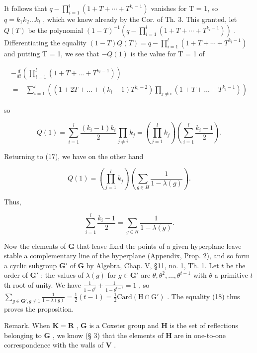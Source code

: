 It follows that \(q - \prod_{i=1}^{l} (1 + T + \cdots + T^{k_i - 1})\) vanishes for T = 1, so \(q = k_1 k_2 \ldots k_l\) , which we knew already by the Cor. of Th. 3. This granted, let \(Q(T)\) be the polynomial \((1 - T)^{-1}(q - \prod_{i=1}^{l} (1 + T + \cdots + T^{k_i - 1}))\) . Differentiating the equality \((1 - T)Q(T) = q - \prod_{i=1}^{l} (1 + T + \cdots + T^{k_i - 1})\) and putting T = 1, we see that \(-Q(1)\) is the value for T = 1 of

\[
\begin{array}{l} - \frac {d}{d t} \left(\prod_ {i = 1} ^ {l} (1 + T + \dots + T ^ {k _ {i} - 1})\right) \\ = - \sum_ {i = 1} ^ {l} \left((1 + 2 T + \dots + (k _ {i} - 1) T ^ {k _ {i} - 2}) \prod_ {j \neq i} (1 + T + \dots + T ^ {k _ {j} - 1})\right) \end{array}
\]

so

\[
Q (1) = \sum_ {i = 1} ^ {l} \frac {\left(k _ {i} - 1\right) k _ {i}}{2} \prod_ {j \neq i} k _ {j} = \left(\prod_ {j = 1} ^ {l} k _ {j}\right) \left(\sum_ {i = 1} ^ {l} \frac {k _ {i} - 1}{2}\right).
\]

Returning to (17), we have on the other hand

\[
Q (1) = \left(\prod_ {j = 1} ^ {l} k _ {j}\right) \left(\sum_ {g \in H} \frac {1}{1 - \lambda (g)}\right).
\]

Thus,

\[
\sum_ {i = 1} ^ {l} \frac {k _ {i} - 1}{2} = \sum_ {g \in H} \frac {1}{1 - \lambda (g)}.\tag{18}
\]

Now the elements of \(\mathbf{G}\) that leave fixed the points of a given hyperplane leave stable a complementary line of the hyperplane (Appendix, Prop. 2), and so form a cyclic subgroup \(\mathbf{G}'\) of \(\mathbf{G}\) by Algebra, Chap. V, §11, no. 1, Th. 1. Let \(t\) be the order of \(\mathbf{G}'\) ; the values of \(\lambda(g)\) for \(g \in \mathbf{G}'\) are \(\theta, \theta^2, \ldots, \theta^{t-1}\) with \(\theta\) a primitive \(t\) th root of unity. We have \(\frac{1}{1-\theta^i} + \frac{1}{1-\theta^{t-i}} = 1\) , so \(\sum_{g \in \mathbf{G}', g \neq 1} \frac{1}{1-\lambda(g)} = \frac{1}{2}(t-1) = \frac{1}{2}\mathrm{Card}(\mathrm{H} \cap \mathrm{G}')\) . The equality (18) thus proves the proposition.

Remark. When \(\mathbf{K} = \mathbf{R}\) , \(\mathbf{G}\) is a Coxeter group and \(\mathbf{H}\) is the set of reflections belonging to \(\mathbf{G}\) , we know (§ 3) that the elements of \(\mathbf{H}\) are in one-to-one correspondence with the walls of \(\mathbf{V}\) .

